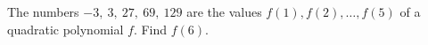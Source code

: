 The numbers $-3,\ 3,\ 27,\ 69,\ 129$ are the values $f(1),f(2),\dots,f(5)$ of a quadratic polynomial $f$. Find $f(6)$.

